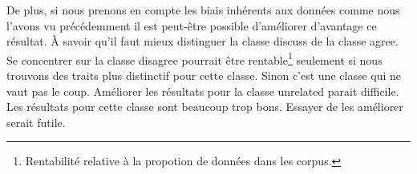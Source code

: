 \documentclass[onecolumn, 12pt]{article}
\begin{document}
 De plus, si nous prenons en compte les biais inhérents aux données comme nous l'avons vu précédemment il est peut-être possible d'améliorer d'avantage ce résultat.
 À savoir qu'il faut mieux distinguer la classe discuss de la classe agree. Se concentrer sur la classe disagree pourrait être rentable\footnote{Rentabilité relative à la propotion de données dans les corpus.} seulement si nous trouvons des traits plus distinctif pour cette classe. Sinon c'est une classe qui ne vaut pas le coup. Améliorer les résultats pour la classe unrelated parait difficile. Les résultats pour cette classe sont beaucoup trop bons. Essayer de les améliorer serait futile.
\end{document}
